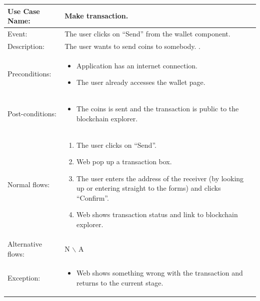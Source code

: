 \begin{table}[]
    \begin{tabular}{| m{4cm} | m{11cm} |}
        \hline
        Use Case Name:     & Make transaction.                                    \\ \hline
        Event:             & The user clicks on “Send” from the wallet component. \\ \hline
        Description:       & The user wants to send coins to somebody.        .   \\ \hline
        Preconditions:     & \begin{itemize}
            \item Application has an internet connection.
            \item The user already accesses the wallet page.
        \end{itemize}                           \\ \hline
        Post-conditions:   & \begin{itemize}
            \item The coins is sent and the transaction is public to the blockchain explorer.
        \end{itemize}                           \\ \hline
        Normal flows:      & \begin{enumerate}
            \item The user clicks on “Send”.
            \item Web pop up a transaction box.
            \item The user enters the address of the receiver (by looking up or entering straight to the forms) and clicks “Confirm”.
            \item Web shows transaction status and link to blockchain explorer.
        \end{enumerate}                           \\ \hline
        Alternative flows: & N $\backslash$ A                                     \\ \hline
        Exception:         & \begin{itemize}
            \item {Web shows something wrong with the transaction and returns to the current stage.}
        \end{itemize}                           \\ \hline
    \end{tabular}
\end{table}
\clearpage

